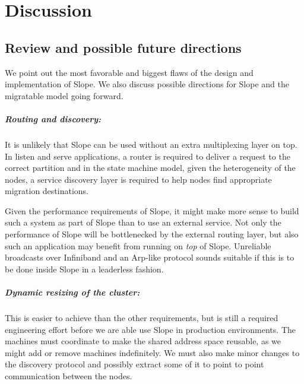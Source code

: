 \chapter{Discussion}
\label{chap:discussionfuture}

\section{Review and possible future directions}
We point out the most favorable and biggest flaws of the design and
implementation of Slope. We also discuss possible directions for Slope
and the migratable model going forward.

\paragraph{Routing and discovery:}
It is unlikely that Slope can be used without an extra multiplexing
layer on top. In listen and serve applications, a router is required to deliver
a request to the correct partition and in the state machine model,
given the heterogeneity of the nodes, a service discovery layer is
required to help nodes find appropriate migration destinations.

Given the
performance requirements of Slope, it might make more sense to build such
a system as part of Slope than to use an external service. Not only the
performance of Slope will be bottlenecked by the external routing layer, but
also such an application may benefit from running on \emph{top} of Slope.
Unreliable broadcasts over Infiniband and an Arp-like protocol sounds suitable
if this is to be done inside Slope in a leaderless fashion.



\paragraph{Dynamic resizing of the cluster:}
This is easier to achieve than the other requirements, but is still a required
engineering effort before we are able use Slope in production environments.
The machines must coordinate to make the shared address space reusable, as we
might add or remove machines indefinitely. We must also make minor changes to
the discovery protocol and possibly extract some of it to point to point
communication between the nodes.




